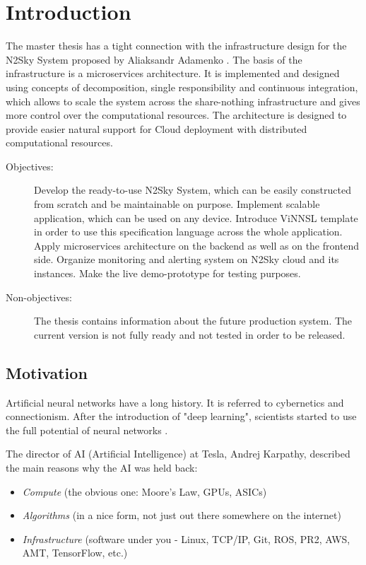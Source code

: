 \section{Introduction}\label{introduction}

The master thesis has a tight connection with the infrastructure design for the N2Sky System proposed by Aliaksandr Adamenko \cite{adamenko}. The basis of the infrastructure is a microservices architecture. It is implemented and designed using concepts of decomposition, single responsibility and continuous integration, which allows to scale the system across the share-nothing infrastructure and gives more control over the computational resources. The architecture is designed to provide easier natural support for Cloud deployment with distributed computational resources.

\begin{description}
\item[Objectives:] Develop the ready-to-use N2Sky System, which can be easily constructed from scratch and be maintainable on purpose. Implement scalable application, which can be used on any device. Introduce ViNNSL template in order to use this specification language across the whole application. Apply microservices architecture on the backend as well as on the frontend side. Organize monitoring and alerting system on N2Sky cloud and its instances. Make the live demo-prototype for testing purposes. 
\item[Non-objectives:] The thesis contains information about the future production system. The current version is not fully ready and not tested in order to be released. 
\end{description}

\subsection{Motivation}\label{motivation}

Artificial neural networks have a long history. It is referred to cybernetics and connectionism.  After the introduction of "deep learning", scientists started to use the full potential of neural networks \cite{Goodfellow}. 

The director of AI (Artificial Intelligence) at Tesla, Andrej Karpathy, described the main reasons why the AI was held back:

\begin{itemize}
\item \emph{Compute} (the obvious one: Moore's Law, GPUs, ASICs)
\item \emph{Algorithms} (in a nice form, not just out there somewhere on the internet)
\item \emph{Infrastructure}  (software under you - Linux, TCP/IP, Git, ROS, PR2, AWS, AMT, TensorFlow, etc.) \cite{andrej}
\end{itemize}

